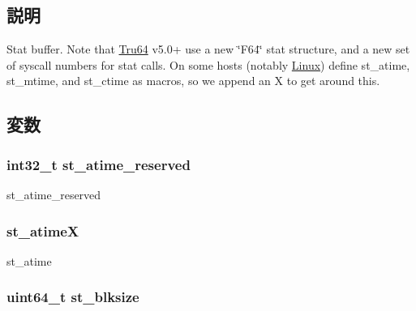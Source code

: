 \subsection{説明}
Stat buffer. Note that \hyperlink{classTru64}{Tru64} v5.0+ use a new \char`\"{}F64\char`\"{} stat structure, and a new set of syscall numbers for stat calls. On some hosts (notably \hyperlink{classLinux}{Linux}) define st\_\-atime, st\_\-mtime, and st\_\-ctime as macros, so we append an X to get around this. 

\subsection{変数}
\hypertarget{structTru64__F64_1_1F64__stat_a51c2cc99b0e93b1a4e80e185d98ae589}{
\subsubsection[{st\_\-atime\_\-reserved}]{\setlength{\rightskip}{0pt plus 5cm}int32\_\-t {\bf st\_\-atime\_\-reserved}}}
\label{structTru64__F64_1_1F64__stat_a51c2cc99b0e93b1a4e80e185d98ae589}


st\_\-atime\_\-reserved \hypertarget{structTru64__F64_1_1F64__stat_a6034c5ae284e55dd118804aeb619f5b9}{
\subsubsection[{st\_\-atimeX}]{ {\bf st\_\-atimeX}}}
\label{structTru64__F64_1_1F64__stat_a6034c5ae284e55dd118804aeb619f5b9}


st\_\-atime \hypertarget{structTru64__F64_1_1F64__stat_adb9252bb3343471e4aaaf7bf7df5363a}{
\subsubsection[{st\_\-blksize}]{\setlength{\rightskip}{0pt plus 5cm}uint64\_\-t {\bf st\_\-blksize}}}
\label{structTru64__F64_1_1F64__stat_adb9252bb3343471e4aaaf7bf7df5363a}


